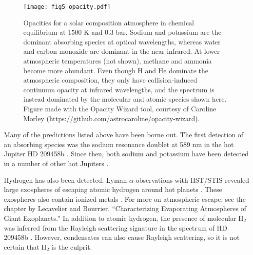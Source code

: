 \documentclass[graybox,natbib,nosecnum]{svmult}
\newcommand{\hbindex}[1]{\hl{#1}\index{#1}}  %
\begin{document}
\begin{figure}
\begin{centering}
\texttt{[image: fig5\_opacity.pdf]}
\caption{Opacities for a solar composition atmosphere in chemical equilibrium at 1500 K and 0.3 bar. Sodium and potassium are the dominant absorbing species at optical wavelengths, whereas water and carbon monoxide are dominant in the near-infrared. At lower atmospheric temperatures (not shown), methane and ammonia become more abundant.  Even though H and He dominate the atmospheric composition, they only have collision-induced continuum opacity at infrared wavelengths, and the spectrum is instead dominated by the molecular and atomic species shown here.  Figure made with the Opacity Wizard tool, courtesy of Caroline Morley (https://github.com/astrocaroline/opacity-wizard).}
\label{fig:opacity}       
\end{centering}
\end{figure}


Many of the predictions listed above have been borne out.  The first detection of an absorbing species was the sodium resonance doublet at 589 nm in the hot Jupiter HD 209458b \citep{charbonneau02}. Since then, both sodium and potassium have been detected in a number of other hot Jupiters \citep[e.g.][]{sing11b, nikolov14}. 

Hydrogen has also been detected.  Lyman-$\alpha$ observations with HST/STIS revealed large exospheres of escaping atomic hydrogen around hot planets \citep[e.g.][]{vidal-madjar03, ehrenreich15}.  These exospheres also contain ionized metals \citep[e.g., OI, CII;][]{vidal-madjar04}. For more on atmospheric escape, see the chapter by Lecavelier and Bourrier, ``Characterizing Evaporating Atmospheres of Giant Exoplanets." In addition to atomic hydrogen, the presence of molecular H$_2$ was inferred from the Rayleigh scattering signature in the spectrum of HD 209458b \citep{lecavelier08}. However, condensates can also cause Rayleigh scattering, so it is not certain that H$_2$ is the culprit. 
\end{document}
